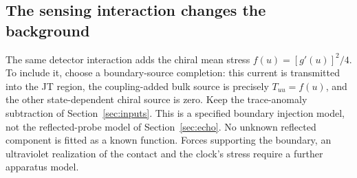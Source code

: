 \documentclass[12pt,a4paper]{article}
\begin{document}
\subsection{The sensing interaction changes the background}
\label{sec:driven-boundary-sensor}

The same detector interaction adds the chiral mean stress
$f(u)=[g'(u)]^2/4$. To include it, choose a boundary-source completion:
this current is transmitted into the JT region, the coupling-added bulk source
is precisely $T_{uu}=f(u)$, and the other state-dependent chiral source is zero.
Keep the trace-anomaly subtraction of Section~\ref{sec:inputs}.
This is a specified boundary injection model, not the reflected-probe model of
Section~\ref{sec:echo}. No unknown reflected component is fitted as a known
function. Forces supporting the boundary, an ultraviolet realization of the
contact and the clock's stress require a further apparatus model.
\end{document}
